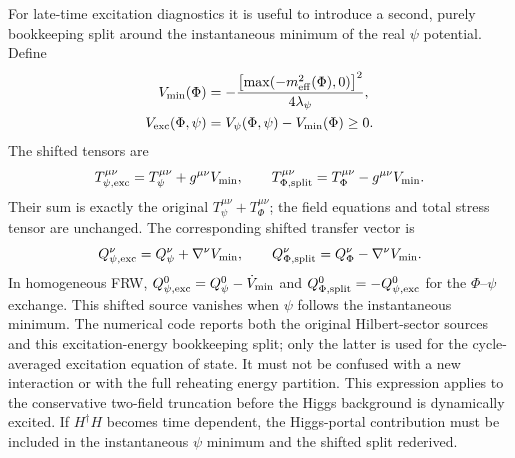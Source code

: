 \documentclass[epj]{svjour}
\begin{document}
For late-time excitation diagnostics it is useful to introduce a
second, purely bookkeeping split around the instantaneous minimum
of the real $\psi$ potential. Define
\begin{align}
V_{\min}(\Phi)&=
-\frac{\left[\max(-m_{\rm eff}^2(\Phi),0)\right]^2}
{4\lambda_\psi},\nonumber\\
V_{\rm exc}(\Phi,\psi)&=V_\psi(\Phi,\psi)-V_{\min}(\Phi)\ge0.
\end{align}
The shifted tensors are
\begin{equation}
T_{\psi,\rm exc}^{\mu\nu}
=T_\psi^{\mu\nu}+g^{\mu\nu}V_{\min},
\qquad
T_{\Phi,\rm split}^{\mu\nu}
=T_\Phi^{\mu\nu}-g^{\mu\nu}V_{\min}.
\end{equation}
Their sum is exactly the original $T_\psi^{\mu\nu}+T_\Phi^{\mu\nu}$;
the field equations and total stress tensor are unchanged. The
corresponding shifted transfer vector is
\begin{equation}
Q_{\psi,\rm exc}^{\nu}
=Q_\psi^\nu+\nabla^\nu V_{\min},
\qquad
Q_{\Phi,\rm split}^{\nu}
=Q_\Phi^\nu-\nabla^\nu V_{\min}.
\end{equation}
In homogeneous FRW,
$Q_{\psi,\rm exc}^{0}=Q_\psi^0-\dot V_{\min}$ and
$Q_{\Phi,\rm split}^{0}=-Q_{\psi,\rm exc}^{0}$ for the
$\Phi$--$\psi$ exchange. This shifted source vanishes when
$\psi$ follows the instantaneous minimum. The numerical code
reports both the original Hilbert-sector sources and this
excitation-energy bookkeeping split; only the latter is used for
the cycle-averaged excitation equation of state. It must not be
confused with a new interaction or with the full reheating energy
partition. This expression applies to the conservative two-field
truncation before the Higgs background is dynamically excited. If
$H^\dagger H$ becomes time dependent, the Higgs-portal contribution
must be included in the instantaneous $\psi$ minimum and the shifted
split rederived.
\end{document}
